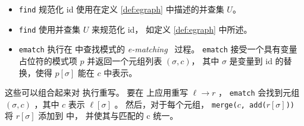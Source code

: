 \begin{itemize}
    \item \texttt{find} 规范化 \eclass id 使用在定义 \ref{def:egraph} 中描述的并查集 $U$。
    \item \texttt{find} 使用并查集 $U$ 来规范化 \eclass id，
    如定义 \ref{def:egraph} 中所述。
    \item \texttt{ematch} 执行在 \egraph 中查找模式的 
          \textit{e-matching}~\cite{simplify, ematching} 过程。 
          \texttt{ematch} 接受一个具有变量占位符的模式项 $p$ 并返回一个元组列表 $(\sigma, c)$，
          其中 $\sigma$ 是变量到 \eclass id 的替换，使得 $p[\sigma]$ 能在 \eclass $c$ 中表示。
\end{itemize}


这些可以组合起来对 \egraph 执行重写。
要在 \egraph 上应用重写 $\ell \to r$ ，
  \texttt{ematch} 会找到元组 $(\sigma, c)$ ，其中 \eclass $c$ 表示 $\ell[\sigma]$ 。
然后，对于每个元组，
  \mbox{\texttt{merge($c$, add($r[\sigma]$))}} 将 $r[\sigma]$ 添加到 \egraph 中，
  并使其与匹配的 \eclass c 统一。


